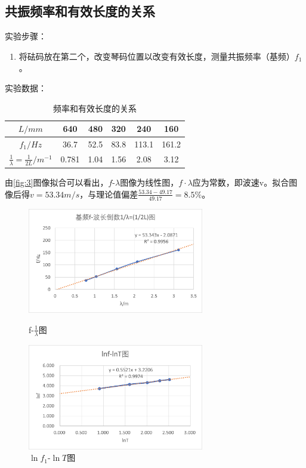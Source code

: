 \documentclass[11pt]{article}
\begin{document}
\subsection{共振频率和有效长度的关系}
\noindent 实验步骤：
\begin{enumerate}
    \item 将砝码放在第二个，改变琴码位置以改变有效长度，测量共振频率（基频）$f_1$。
\end{enumerate}
\noindent 实验数据：
\begin{table}[H]
    \centering
    \caption{频率和有效长度的关系}
    \begin{tabular}{|c|c|c|c|c|c|}
    \hline
        $L/mm$ & 640 & 480 & 320 & 240 & 160 \\ \hline
        $f_1/Hz$ & 36.7 & 52.5 & 83.8 & 113.1 & 161.2 \\ \hline
        $\frac{1}{\lambda}=\frac{1}{2L}/m^{-1}$ & 0.781  & 1.04   & 1.56   & 2.08   & 3.12 \\\hline
    \end{tabular}
\end{table}
\begin{figure}[H]
    
\end{figure}
由\cref{fig:3}图像拟合可以看出，$f$-$\lambda$图像为线性图，$f\cdot \lambda$应为常数，即波速v。拟合图像后得$v=53.34m/s$，与理论值偏差$\frac{53.34-49.17}{49.17}=8.5\%$。

\begin{figure}[H]
    \centering
    \begin{minipage}[t]{0.49\linewidth}
        \centering
        \includegraphics[width=7.7cm]{Fig/3.png}
        \caption{f-$\frac{1}{\lambda}$图}
        \label{fig:3}
    \end{minipage}
    \begin{minipage}[t]{0.49\linewidth}
        \centering
        \includegraphics[width=7.7cm]{Fig/4.png}
        \caption{$\ln f_1$-$\ln T$图}
        \label{fig:4}
    \end{minipage} 
\end{figure}
\end{document}
